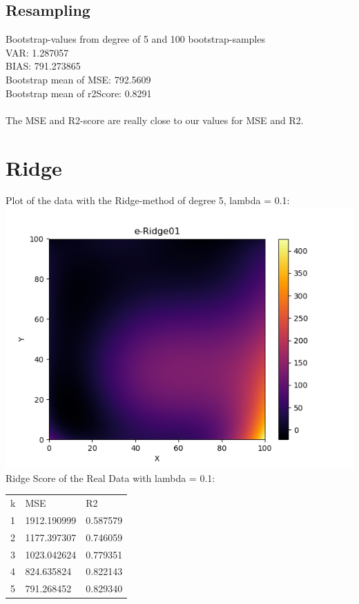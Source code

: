 \documentclass[a4paper,norsk]{article}
\begin{document}
\subsection*{Resampling}
Bootstrap-values from degree of 5 and 100 bootstrap-samples
\\VAR: 1.287057
\\BIAS: 791.273865
\\Bootstrap mean of MSE: 792.5609
\\Bootstrap mean of r2Score: 0.8291
\\
\\The MSE and R2-score are really close to our values for MSE and R2.

\section*{Ridge}
Plot of the data with the Ridge-method of degree 5, lambda = 0.1:
\\ \includegraphics[scale=.7]{e-Ridge01}
\\ Ridge Score of the Real Data with lambda = 0.1:
\begin{table}[!h]
\begin{tabular}{lll}
k & MSE                   & R2                 \\
1 & 1912.190999  & 0.587579 \\
2 & 1177.397307  & 0.746059 \\
3 & 1023.042624  & 0.779351 \\
4 & 824.635824  & 0.822143 \\
5 & 791.268452 & 0.829340
\end{tabular}
\end{table}
\end{document}
